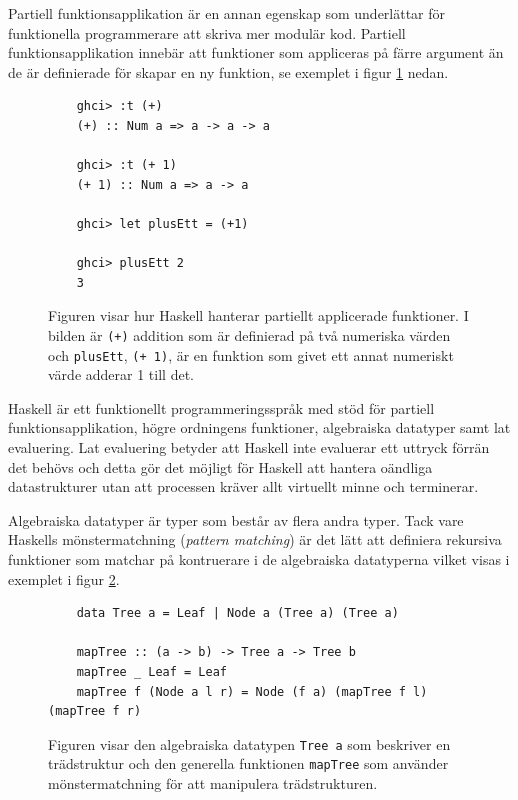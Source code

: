 \documentclass[12pt,a4paper,twoside,openright]{article}
\begin{document}
Partiell funktionsapplikation är en annan egenskap som underlättar för
funktionella programmerare att skriva mer modulär kod. Partiell
funktionsapplikation innebär att funktioner som appliceras på färre
argument än de är definierade för skapar en ny funktion, se exemplet i
figur \ref{fig:hask_partfunapp} nedan.

\begin{figure}[H]
  \begin{verbatim}
    ghci> :t (+)
    (+) :: Num a => a -> a -> a

    ghci> :t (+ 1)
    (+ 1) :: Num a => a -> a

    ghci> let plusEtt = (+1)

    ghci> plusEtt 2
    3
  \end{verbatim}
  \caption{Figuren visar hur Haskell hanterar partiellt applicerade
    funktioner. I bilden är \texttt{(+)} addition som är
    definierad på två numeriska värden och
    \texttt{plusEtt}, \texttt{(+ 1)}, är en
    funktion som givet ett annat numeriskt värde adderar 1 till det.}
  \label{fig:hask_partfunapp}
\end{figure}

Haskell är ett funktionellt programmeringsspråk med stöd för partiell
funktionsapplikation, högre ordningens funktioner, algebraiska
datatyper samt lat evaluering. Lat evaluering betyder att Haskell inte
evaluerar ett uttryck förrän det behövs och detta gör det möjligt för
Haskell att hantera oändliga datastrukturer utan att processen kräver
allt virtuellt minne och terminerar.

Algebraiska datatyper är typer som består av flera andra typer. Tack
vare Haskells mönstermatchning (\textit{pattern matching}) är det lätt
att definiera rekursiva funktioner som matchar på kontruerare i de
algebraiska datatyperna vilket visas i exemplet i figur
\ref{fig:hask_alg_type}.

\begin{figure}[H]
  \begin{verbatim}
    data Tree a = Leaf | Node a (Tree a) (Tree a)

    mapTree :: (a -> b) -> Tree a -> Tree b
    mapTree _ Leaf = Leaf
    mapTree f (Node a l r) = Node (f a) (mapTree f l) (mapTree f r)
  \end{verbatim}
  \caption{Figuren visar den algebraiska datatypen
    \texttt{Tree a} som beskriver en trädstruktur och den
    generella funktionen \texttt{mapTree} som använder
    mönstermatchning för att manipulera trädstrukturen.}
  \label{fig:hask_alg_type}
\end{figure}
\end{document}
